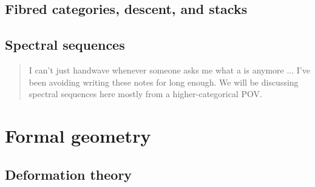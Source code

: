             
            
        \begin{appendices}
            \chapter{Fibred categories, descent, and stacks}
                \begin{abstract}
            
                \end{abstract}
                
                \minitoc
                
                
                
                

            \chapter{Spectral sequences}
                \begin{abstract}
                    I can't just handwave whenever someone asks me what a  is anymore ... I've been avoiding writing these notes for long enough. We will be discussing spectral sequences here mostly from a higher-categorical POV.
                \end{abstract}
                
                \minitoc

                

                
            
        \end{appendices}

    \part{Formal geometry}
        \chapter{Deformation theory}
            \begin{abstract}
                
            \end{abstract}
            
